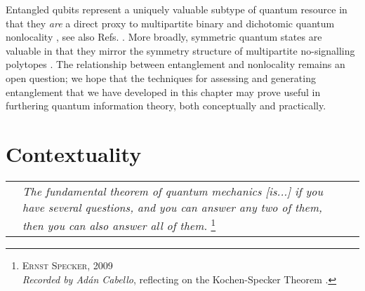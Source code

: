 \documentclass[
  12pt          %
  ,letterpaper  %
  ,center       %
  ,noupper      %
  ,english,fleqn]{uconnthesis}
\begin{document}
Entangled qubits represent a uniquely valuable subtype of quantum resource in that they \emph{are} a direct proxy to multipartite binary and dichotomic quantum nonlocality \cite{MasanesQubits}, see also Refs. \cite{GivenQB.NQubit,GivenQB.Cabello,NQubitEquivalences}.  More broadly, symmetric quantum states are valuable in that they mirror the symmetry structure of multipartite no-signalling \glspl{polytope} \cite{GisinFramework2012,roberts_thesis,WernerWolfQB,WehnerQB,ScaraniNotes,*ScaraniNotes2}. The relationship between entanglement and nonlocality remains an open question; we hope that the techniques for assessing and generating entanglement that we have developed in this chapter may prove useful in furthering quantum information theory, both conceptually and practically.






















\chapter{Contextuality}
\vspace*{\fill}
\begin{spacing}{1.5}
\begin{tabularx}{400pt}{m{1cm}Lm{1cm}}
& \noindent\textit{The fundamental theorem of quantum mechanics [is...] if you have several questions, and you can answer any two of them, then you can also answer all of them.}
\footnote{\textsc{Ernst Specker}, 2009\\ \textit{Recorded by Adán Cabello}, reflecting on the Kochen-Specker Theorem \cite{EPSpeckerVid}.} &
\end{tabularx}
\end{spacing}
\vspace*{\fill}
\end{document}
